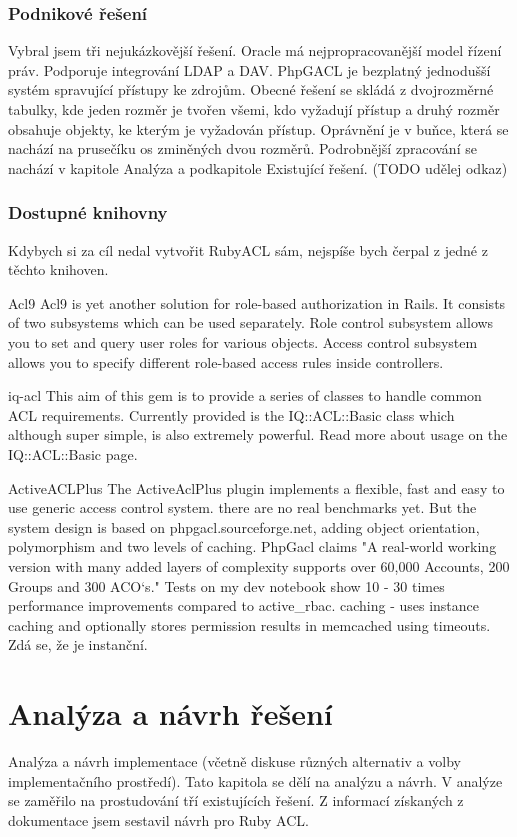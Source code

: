 \documentclass[11pt,twoside,a4paper]{book}
\begin{document}
\subsection{Podnikové řešení}
Vybral jsem tři nejukázkovější řešení.
Oracle má nejpropracovanější model řízení práv. Podporuje integrování LDAP a DAV.
PhpGACL je bezplatný jednodušší systém spravující přístupy ke zdrojům.
Obecné řešení se skládá z dvojrozměrné tabulky, kde jeden rozměr je tvořen všemi, kdo vyžadují přístup a druhý rozměr obsahuje objekty, ke kterým je vyžadován přístup. Oprávnění je v buňce, která se nachází na prusečíku os zminěných dvou rozměrů.
Podrobnější zpracování se nachází v kapitole Analýza a podkapitole Existující řešení. (TODO udělej odkaz)

\subsection{Dostupné knihovny}
Kdybych si za cíl nedal vytvořit RubyACL sám, nejspíše bych čerpal z jedné z těchto knihoven.

Acl9
Acl9 is yet another solution for role-based authorization in Rails. It consists of two subsystems which can be used separately.
Role control subsystem allows you to set and query user roles for various objects.
Access control subsystem allows you to specify different role-based access rules inside controllers.

iq-acl
This aim of this gem is to provide a series of classes to handle common ACL requirements. Currently provided is the IQ::ACL::Basic class which although super simple, is also extremely powerful. Read more about usage on the IQ::ACL::Basic page.

ActiveACLPlus
The ActiveAclPlus plugin implements a flexible, fast and easy to use generic access control system. 
there are no real benchmarks yet. But the system design is based on phpgacl.sourceforge.net, adding object orientation, polymorphism and two levels of caching. PhpGacl claims "A real-world working version with many added layers of complexity supports over 60,000 Accounts, 200 Groups and 300 ACO‘s." Tests on my dev notebook show 10 - 30 times performance improvements compared to active\_rbac.
caching - uses instance caching and optionally stores permission results in memcached using timeouts. 
Zdá se, že je instanční.


\chapter{Analýza a návrh řešení}
Analýza a návrh implementace (včetně diskuse různých alternativ a volby implementačního prostředí).
Tato kapitola se dělí na analýzu a návrh. V analýze se zaměřilo na prostudování tří existujících řešení. Z informací získaných z dokumentace jsem sestavil návrh pro Ruby ACL.
\end{document}
